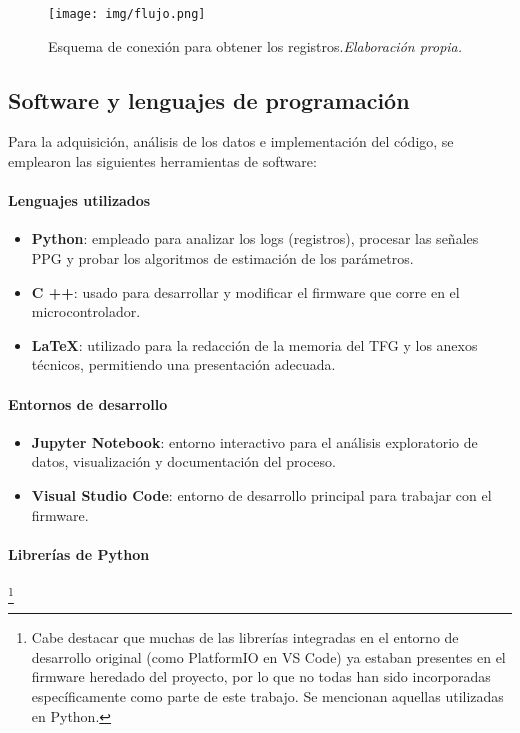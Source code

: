 \begin{figure}[H]
    \centering
    \texttt{[image: img/flujo.png]}
    \caption{Esquema de conexión para obtener los registros.\textit{Elaboración propia.}}
    \label{fig:flujo}
\end{figure}

\subsection{Software y lenguajes de programación}

Para la adquisición, análisis de los datos e implementación del código, se emplearon las siguientes herramientas de software:

\paragraph{Lenguajes utilizados}

\begin{itemize}
    \item \textbf{Python}: empleado para analizar los logs (registros), procesar las señales PPG y probar los algoritmos de estimación de los parámetros. 
    \item \textbf{C ++}: usado para desarrollar y modificar el firmware que corre en el microcontrolador.
    \item \textbf{LaTeX}: utilizado para la redacción de la memoria del TFG y los anexos técnicos, permitiendo una presentación adecuada.
\end{itemize}

\paragraph{Entornos de desarrollo}

\begin{itemize}
    \item \textbf{Jupyter Notebook}: entorno interactivo para el análisis exploratorio de datos, visualización y documentación del proceso.
    \item \textbf{Visual Studio Code}: entorno de desarrollo principal para trabajar con el firmware. 
\end{itemize}


\paragraph{Librerías de Python}\footnote{Cabe destacar que muchas de las librerías integradas en el entorno de desarrollo original (como PlatformIO en VS Code) ya estaban presentes en el firmware heredado del proyecto, por lo que no todas han sido incorporadas específicamente como parte de este trabajo. Se mencionan aquellas utilizadas en Python.}

